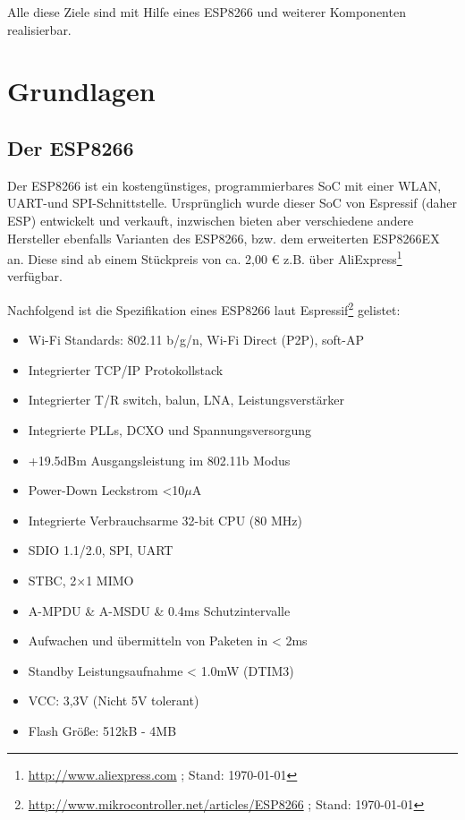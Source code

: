 Alle diese Ziele sind mit Hilfe eines ESP8266 und weiterer Komponenten realisierbar.

\section{Grundlagen}
\subsection{Der ESP8266}
Der ESP8266 ist ein kostengünstiges, programmierbares \ac{SoC} mit einer \acs{WLAN}, \acs{UART}-und \acs{SPI}-Schnittstelle.
Ursprünglich wurde dieser \acs{SoC} von Espressif (daher ESP) entwickelt und verkauft, inzwischen bieten aber verschiedene andere Hersteller ebenfalls Varianten des ESP8266, bzw. dem erweiterten ESP8266EX an.
Diese sind ab einem Stückpreis von ca. 2,00 € z.B. über AliExpress\footnote{\url{http://www.aliexpress.com} ; Stand: \today} verfügbar.

Nachfolgend ist die Spezifikation eines ESP8266 laut Espressif\footnote{\url{http://www.mikrocontroller.net/articles/ESP8266} ; Stand: \today} gelistet:

\begin{itemize}
    \item Wi-Fi Standards: 802.11 b/g/n, Wi-Fi Direct (\acs{P2P}), \acs{soft-AP}
    \item Integrierter TCP/IP Protokollstack
    \item Integrierter \acs{T/R} switch, \acs{balun}, \acs{LNA}, Leistungsverstärker
    \item Integrierte \acs{PLL}s, \acs{DCXO} und Spannungsversorgung
    \item +19.5dBm Ausgangsleistung im 802.11b Modus
    \item Power-Down Leckstrom <10$\mu$A
    \item Integrierte Verbrauchsarme 32-bit CPU (80 MHz)
    \item \acs{SDIO} 1.1/2.0, \acs{SPI}, \acs{UART}
    \item \acs{STBC}, 2×1 \acs{MIMO}
    \item \acs{A-MPDU} \& \acs{A-MSDU} \& 0.4ms Schutzintervalle
    \item Aufwachen und übermitteln von Paketen in < 2ms
    \item Standby Leistungsaufnahme < 1.0mW (\acs{DTIM3})
    \item\acs{VCC}: 3,3V (Nicht 5V tolerant)
    \item Flash Größe: 512kB - 4MB 
\end{itemize}

